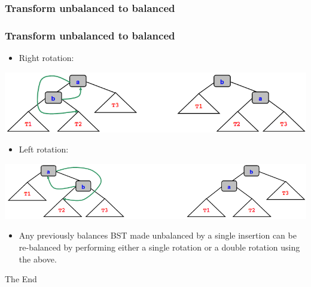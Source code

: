 \documentclass{beamer}
\begin{document}
\subsubsection{Transform unbalanced to balanced}
\begin{frame}
\frametitle{Transform unbalanced to balanced}
\begin{itemize}
\item Right rotation:
\end{itemize}
\includegraphics[scale=0.25]{right.png}
\begin{itemize}
\item Left rotation:
\end{itemize}
\includegraphics[scale=0.25]{left.png}
\begin{itemize}
\item Any previously balances BST made unbalanced by a single insertion can be re-balanced by performing either a single rotation or a double rotation using the above.
\end{itemize}
\end{frame}
\begin{frame} 
\Huge{\centerline{The End}}
\end{frame}
\end{document}
